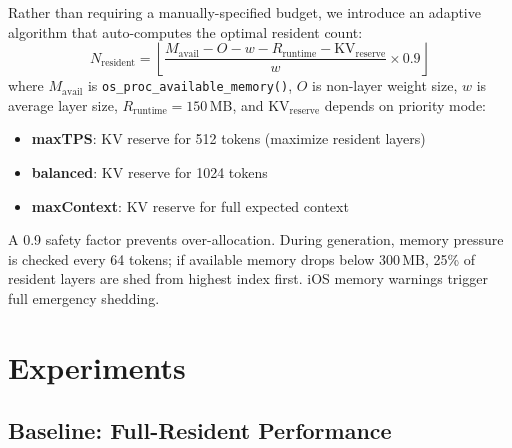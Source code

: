 \documentclass[10pt,a4paper]{article}
\begin{document}
Rather than requiring a manually-specified budget, we introduce an adaptive algorithm that auto-computes the optimal resident count:
\begin{equation}
    N_{\text{resident}} = \left\lfloor \frac{M_{\text{avail}} - O - w - R_{\text{runtime}} - \text{KV}_{\text{reserve}}}{w} \times 0.9 \right\rfloor
\end{equation}
where $M_{\text{avail}}$ is \texttt{os\_proc\_available\_memory()}, $O$ is non-layer weight size, $w$ is average layer size, $R_{\text{runtime}} = 150$\,MB, and $\text{KV}_{\text{reserve}}$ depends on priority mode:

\begin{itemize}
    \item \textbf{maxTPS}: KV reserve for 512 tokens (maximize resident layers)
    \item \textbf{balanced}: KV reserve for 1024 tokens
    \item \textbf{maxContext}: KV reserve for full expected context
\end{itemize}

A 0.9 safety factor prevents over-allocation. During generation, memory pressure is checked every 64 tokens; if available memory drops below 300\,MB, 25\% of resident layers are shed from highest index first. iOS memory warnings trigger full emergency shedding.

\section{Experiments}

\subsection{Baseline: Full-Resident Performance}
\end{document}
